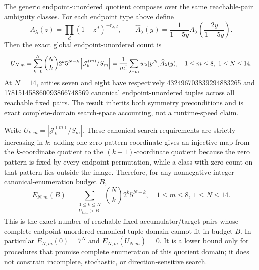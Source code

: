 \documentclass{article}
\newcommand{\fitmath}[1]{\resizebox{0.99\linewidth}{!}{$\displaystyle #1$}}
\begin{document}
The generic endpoint-unordered quotient composes over the same reachable-pair
ambiguity classes. For each endpoint type above define
\[
  A_\lambda(z)=\prod_d(1-z^d)^{-r_{\lambda,d}},\qquad
  \widehat A_\lambda(y)=\frac{1}{1-5y}
    A_\lambda\!\left(\frac{2y}{1-5y}\right).
\]
Then the exact global endpoint-unordered count is
\begin{equation}
  \fitmath{%
    U_{N,m}
      =\sum_{k=0}^{N}\binom{N}{k}2^k5^{N-k}
        \left|\mathcal{J}^{(m)}_k/S_m\right|
      =\frac{1}{m!}\sum_{\lambda\vdash m}w_\lambda
        [y^N]\widehat A_\lambda(y),
    \quad 1\leq m\leq8,\ 1\leq N\leq14.
  }
  \label{eq:optimization-crazy-global-unordered-preimage-tuple-quotient}
\end{equation}
At $N=14$, arities seven and eight have respectively
432496703839294883265 and 178151458860093866748569 canonical endpoint-unordered
tuples across all reachable fixed pairs. The result inherits both symmetry
preconditions and is exact complete-domain search-space accounting, not a
runtime-speed claim.

Write $U_{k,m}=|\mathcal{J}^{(m)}_k/S_m|$. These canonical-search requirements
are strictly increasing in $k$: adding one zero-pattern coordinate gives an
injective map from the $k$-coordinate quotient to the $(k+1)$-coordinate
quotient because the zero pattern is fixed by every endpoint permutation, while
a class with zero count on that pattern lies outside the image. Therefore, for
any nonnegative integer canonical-enumeration budget $B$,
\begin{equation}
  E_{N,m}(B)
    =\sum_{\substack{0\leq k\leq N\\ U_{k,m}>B}}
      \binom{N}{k}2^k5^{N-k},
  \quad 1\leq m\leq8,\ 1\leq N\leq14.
  \label{eq:optimization-crazy-profile-unordered-tuple-budget-exceedance}
\end{equation}
This is the exact number of reachable fixed accumulator/target pairs whose
complete endpoint-unordered canonical tuple domain cannot fit in budget $B$.
In particular $E_{N,m}(0)=7^N$ and $E_{N,m}(U_{N,m})=0$. It is a lower bound
only for procedures that promise complete enumeration of this quotient domain;
it does not constrain incomplete, stochastic, or direction-sensitive search.
\end{document}
